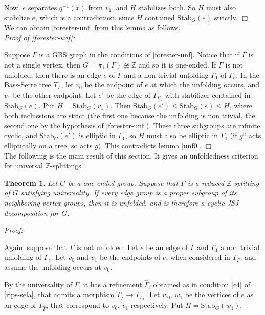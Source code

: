 \documentclass[12pt]{amsart}
\newtheorem{theorem}{Theorem}[section]
\newcommand{\Z}{\mathbb{Z}}
\newcommand{\Stab}{\mbox{Stab}}
\begin{document}
Now, $e$ separates $q^{-1}(x)$ from $v_1$, and $H$ stabilizes both. So $H$ must also stabilize $e$, which is a contradiction, since $H$ contained $\Stab_G(e)$ strictly. $\Box$ \\

We can obtain \ref{forester-unf} from this lemma as follows. \\

{\em Proof of \ref{forester-unf}:}

Suppose $\Gamma$ is a GBS graph in the conditions of \ref{forester-unf}. Notice that if $\Gamma$ is not a single vertex, then $G=\pi_1(\Gamma)\ncong\Z$ and so it is one-ended. If $\Gamma$ is not unfolded, then there is an edge $e$ of $\Gamma$ and a non trivial unfolding $\Gamma_1$ of $\Gamma_e$. In the Bass-Serre tree $T_{\Gamma}$, let $v_0$ be the endpoint of $e$ at which the unfolding occurs, and $v_1$ be the other endpoint. Let $e'$ be the edge of $T_{\Gamma_1}$ with stabilizer contained in $\Stab_G(e)$. Put $H=\Stab_G(v_1)$. Then $\Stab_G(e')\leq\Stab_G(e)\leq H$, where both inclussions are strict (the first one because the unfolding is non trivial, the second one by the hypothesis of \ref{forester-unf}). These three subgroups are infinite cyclic, and $\Stab_G(e')$ is elliptic in $\Gamma_1$, so $H$ must also be elliptic in $\Gamma_1$ (if $g^n$ acts elliptically on a tree, so acts $g$). This contradicts lemma \ref{unf0}. $\Box$  \\ 

The following is the main result of this section. It gives an unfoldedness criterion for universal $\Z$-splittings.

\begin{theorem} \label{unf-univ} Let $G$ be a one-ended group. Suppose that $\Gamma$ is a reduced $\Z$-splitting of $G$ satisfying universality. If every edge group is a proper subgroup of its neighboring vertex groups, then it is unfolded, and is therefore a cyclic JSJ decomposition for $G$.
\end{theorem}

{\em Proof:}

Again, suppose that $\Gamma$ is not unfolded. Let $e$ be an edge of $\Gamma$ and $\Gamma_1$ a non trivial unfolding of $\Gamma_e$. Let $v_0$ and $v_1$ be the endpoints of $e$, when considered in $T_{\Gamma}$, and assume the unfolding occurs at $v_0$.

By the universality of $\Gamma$, it has a refinement $\hat \Gamma$, obtained as in condition \ref{c4} of \ref{rips-sela}, that admits a morphism $T_{\hat\Gamma} \to T_{\Gamma_1}$. Let $w_0$, $w_1$ be the vertices of $e$ as an edge of $T_{\hat \Gamma}$, that correspond to $v_0$, $v_1$ respectively. Put $H=\Stab_G(w_1)$. 
\end{document}
